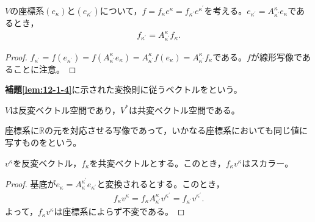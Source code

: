\documentclass[uplatex]{jsarticle}
\begin{document}
\begin{hodai}[変換則]
  \label{lem:12-1-4}
  $V$の座標系$(e_{\kappa})$と$(e_{\kappa^{\prime}})$について，$f = f_{\kappa}e^{\kappa} = f_{\kappa^{\prime}} e^{\kappa^{\prime}}$を考える。$e_{\kappa^{\prime}} = A_{\kappa^{\prime}}^{\kappa} e_{\kappa}$であるとき，
  \begin{align}
    f_{\kappa^{\prime}} = A_{\kappa^{\prime}}^{\kappa} f_{\kappa}.
  \end{align}
\end{hodai}

\begin{proof}
  $f_{\kappa^{\prime}} = f(e_{\kappa^{\prime}}) = f(A_{\kappa^{\prime}}^{\kappa}e_{\kappa}) = A_{\kappa^{\prime}}^{\kappa} f(e_{\kappa}) = A_{\kappa^{\prime}}^{\kappa} f_{\kappa}$である。$f$が線形写像であることに注意。
\end{proof}

\begin{teigi}
  \textbf{補題\ref{lem:12-1-4}}に示された変換則に従うベクトルをという。
\end{teigi}

\begin{remark}
  $V$は反変ベクトル空間であり，$V^{*}$は共変ベクトル空間である。
\end{remark}

\begin{teigi}
  座標系に$\mathbb{R}$の元を対応させる写像であって，いかなる座標系においても同じ値に写すものをという。
\end{teigi}

\begin{hodai}
  $v^{\kappa}$を反変ベクトル，$f_{\kappa}$を共変ベクトルとする。このとき，$f_{\kappa} v^{\kappa}$はスカラー。
\end{hodai}

\begin{proof}
  基底が$e_{\kappa} = A_{\kappa}^{\kappa^{\prime}} e_{\kappa^{\prime}}$と変換されるとする。このとき，
  \begin{align}
    f_{\kappa} v^{\kappa} = f_{\kappa} A^{\kappa}_{\kappa^{\prime}} v^{\kappa^{\prime}} = f_{\kappa^{\prime}} v^{\kappa^{\prime}}.
  \end{align}
  よって，$f_{\kappa} v^{\kappa}$は座標系によらず不変である。
\end{proof}
\end{document}
